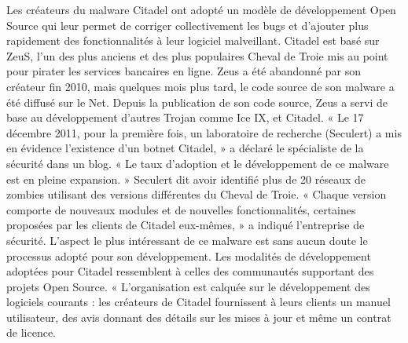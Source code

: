 Les créateurs du malware Citadel ont adopté un modèle de développement Open Source qui leur permet de corriger collectivement les bugs et d'ajouter plus rapidement des fonctionnalités à leur logiciel malveillant. Citadel est basé sur ZeuS, l'un des plus anciens et des plus populaires Cheval de Troie mis au point pour pirater les services bancaires en ligne. Zeus a été abandonné par son créateur fin 2010, mais quelques mois plus tard, le code source de son malware a été diffusé sur le Net. Depuis la publication de son code source, Zeus a servi de base au développement d'autres Trojan comme Ice IX,  et Citadel. « Le 17 décembre 2011, pour la première fois, un laboratoire de recherche (Seculert) a mis en évidence l'existence d'un botnet Citadel, » a déclaré le spécialiste de la sécurité dans un blog. « Le taux d'adoption et le développement de ce malware est en pleine expansion. » Seculert dit avoir identifié plus de 20 réseaux de zombies utilisant des versions différentes du Cheval de Troie. « Chaque version comporte de nouveaux modules et de nouvelles fonctionnalités, certaines proposées par les clients de Citadel eux-mêmes, » a indiqué l'entreprise de sécurité. L'aspect le plus intéressant de ce malware est sans aucun doute le processus adopté pour son développement. Les modalités de développement adoptées pour Citadel ressemblent à celles des communautés supportant des projets Open Source. « L'organisation est calquée sur le développement des logiciels courants : les créateurs de Citadel fournissent à leurs clients un manuel utilisateur, des avis donnant des détails sur les mises à jour et même un contrat de licence.